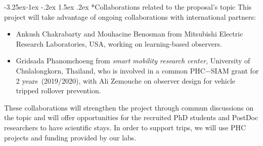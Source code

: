 \documentclass[a4paper,11pt]{article}
\makeatletter
\newcounter {subsubsubsection}[subsubsection]
\newcommand\subsubsubsection{\@startsection{subsubsubsection}{4}{\z@}%
                                     {-3.25ex\@plus -1ex \@minus -.2ex}%
                                     {1.5ex \@plus .2ex}%
                                     {\normalfont\normalsize\bfseries}}
\makeatother
\begin{document}
\vspace{-0.3cm}
\subsubsubsection*{Collaborations related to the proposal's topic}
This project will take advantage of ongoing collaborations with international partners:
\begin{itemize}[leftmargin=.25in,noitemsep,nolistsep]
\item {Ankush \sc Chakrabarty} and {Mouhacine \sc Benosman} from Mitsubishi Electric Research Laboratories, USA, working on learning-based observers.
\item {Gridsada \sc Phanomchoeng} from {\it smart mobility research center}, University of Chulalongkorn, Thailand, who is involved in a common PHC$-$SIAM grant for 2 years~(2019/2020), with {Ali \sc Zemouche} on observer design for vehicle tripped rollover prevention.
\end{itemize}
These collaborations will strengthen the project through commun discussions on the topic and will offer opportunities for the recruited PhD students and PostDoc researchers to have scientific stays. In order to support trips, we will use PHC projects and funding provided by our labs.
%
%
%
\end{document}
